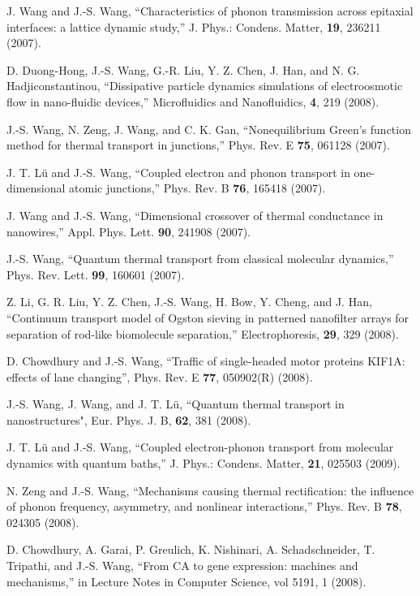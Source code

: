 \itm J. Wang and J.-S. Wang, ``Characteristics of phonon transmission across 
epitaxial interfaces: a lattice dynamic study,''
J. Phys.: Condens. Matter, {\bf 19}, 236211 (2007).

\itm D. Duong-Hong, J.-S. Wang, G.-R. Liu, Y. Z. Chen, J. Han, 
and N. G. Hadjiconstantinou, ``Dissipative particle dynamics simulations of
electroosmotic flow in nano-fluidic devices,'' Microfluidics and Nanofluidics, 
{\bf 4}, 219 (2008).

\itm J.-S. Wang, N. Zeng, J. Wang, and C. K. Gan, ``Nonequilibrium Green's
function method for thermal transport in junctions,'' 
Phys. Rev. E {\bf 75}, 061128 (2007).

\itm J. T. L\"u and J.-S. Wang, ``Coupled electron and phonon transport
in one-dimensional atomic junctions,'' Phys. Rev. B {\bf 76}, 165418 (2007).

\itm J. Wang and J.-S. Wang, ``Dimensional crossover of thermal 
conductance in nanowires,'' 
Appl. Phys. Lett. {\bf 90}, 241908 (2007).

\itm J.-S. Wang, ``Quantum thermal transport from classical molecular dynamics,'' Phys. Rev. Lett. {\bf 99}, 160601 (2007).

\itm Z. Li, G. R. Liu, Y. Z. Chen, J.-S. Wang, H. Bow, Y. Cheng, and J. Han, 
``Continuum transport model of Ogston sieving in patterned nanofilter 
arrays for separation of rod-like biomolecule separation,'' 
Electrophoresis, {\bf 29}, 329 (2008).

\itm D. Chowdhury and J.-S. Wang, ``Traffic of single-headed motor proteins 
KIF1A: effects of lane changing'', Phys. Rev. E {\bf 77}, 050902(R) (2008). 

\itm J.-S. Wang, J. Wang, and J. T. L\"u, ``Quantum thermal transport in 
nanostructures", Eur. Phys. J. B, {\bf 62}, 381 (2008).

\itm J. T. L\"u and J.-S. Wang, ``Coupled electron-phonon transport 
from molecular dynamics with quantum baths,'' J. Phys.: Condens. Matter, 
{\bf 21}, 025503 (2009).

\itm N. Zeng and J.-S. Wang, ``Mechanisms causing thermal rectification: 
the influence of phonon frequency, asymmetry, and nonlinear interactions,'' 
Phys. Rev. B {\bf 78}, 024305 (2008).

\itm D. Chowdhury, A. Garai, P. Greulich, K. Nishinari, A. Schadschneider, 
T. Tripathi, and J.-S. Wang, ``From CA to gene expression: machines and 
mechanisms,'' in Lecture Notes in Computer Science, vol {5191}, 1 (2008).

